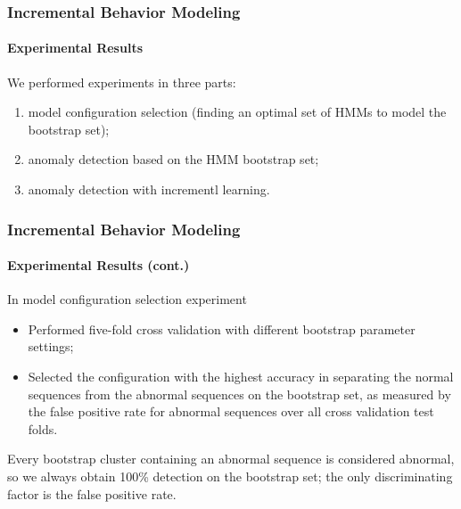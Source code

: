 
\begin{frame}
    \frametitle{Incremental Behavior Modeling}
    \framesubtitle{Experimental Results}

    We performed experiments in three parts:
    \begin{enumerate}
        \item model configuration selection (finding an optimal 
            set of HMMs to model the bootstrap set); 
        \item anomaly detection based on the HMM bootstrap set; 
        \item anomaly detection with incrementl learning.
    \end{enumerate}

\end{frame}


\begin{frame}
    \frametitle{Incremental Behavior Modeling}
    \framesubtitle{Experimental Results (cont.)}

    In model configuration selection experiment
    \begin{itemize}
        \item Performed five-fold cross validation with different 
            bootstrap parameter settings; 
        \item Selected the configuration with the highest accuracy 
            in separating the normal sequences from the abnormal 
            sequences on the bootstrap set, as measured by the 
            \alert{false positive rate} for abnormal sequences over 
            all cross validation test folds. 
    \end{itemize}

    Every bootstrap cluster containing an abnormal sequence is considered 
    abnormal, so we always obtain 100\% detection on the bootstrap set;
    the only discriminating factor is the false positive rate.

\end{frame}


